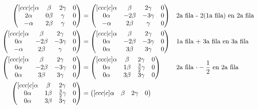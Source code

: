 \documentclass[letterpaper]{article}
\renewcommand{\*}{\cdot}
\theoremstyle{definition}
\begin{document}
		\begin{align*}
		\begin{pmatrix}[ccc|c]
		\alpha & \beta & 2\gamma & 0\\
		2\alpha & 0\beta & \gamma & 0 \\
		-\alpha & 2\beta & \gamma & 0 
		\end{pmatrix} & = \begin{pmatrix}[ccc|c]
		\alpha & \beta & 2\gamma & 0\\
		0\alpha & -2\beta & -3\gamma & 0\\
		-\alpha & 2\beta & \gamma & 0
		\end{pmatrix} && \text{2a fila - 2(1a fila) en 2a fila}\\
		\begin{pmatrix}[ccc|c]
		\alpha & \beta & 2\gamma & 0\\
		0\alpha & -2\beta & -3\gamma & 0\\
		-\alpha & 2\beta & \gamma & 0 
		\end{pmatrix} & = \begin{pmatrix}[ccc|c]
		\alpha & \beta & 2\gamma & 0\\
		0\alpha & -2\beta & -3\gamma & 0\\
		0\alpha & 3\beta & 3\gamma & 0
		\end{pmatrix} && \text{1a fila + 3a fila en 3a fila}\\
		\begin{pmatrix}[ccc|c]
		\alpha & \beta & 2\gamma & 0\\
		0\alpha & -2\beta & -3\gamma & 0\\
		0\alpha & 3\beta & 3\gamma & 0
		\end{pmatrix}  & = \begin{pmatrix}[ccc|c]
		\alpha & \beta & 2\gamma & 0\\
		0\alpha & 1\beta & \frac{3}{2}\gamma & 0\\
		0\alpha & 3\beta & 3\gamma & 0
		\end{pmatrix}  && \text{2a fila $ \* -\frac{1}{2} $ en 2a fila}\\
			 \begin{pmatrix}[ccc|c]
			 \alpha & \beta & 2\gamma & 0\\
			 0\alpha & 1\beta & \frac{3}{2}\gamma & 0\\
			 0\alpha & 3\beta & 3\gamma & 0
			 \end{pmatrix} & =\begin{pmatrix}[ccc|c]
			 \alpha & \beta & 2\gamma & 0\\

\end{pmatrix}
\end{align*}
\end{document}
